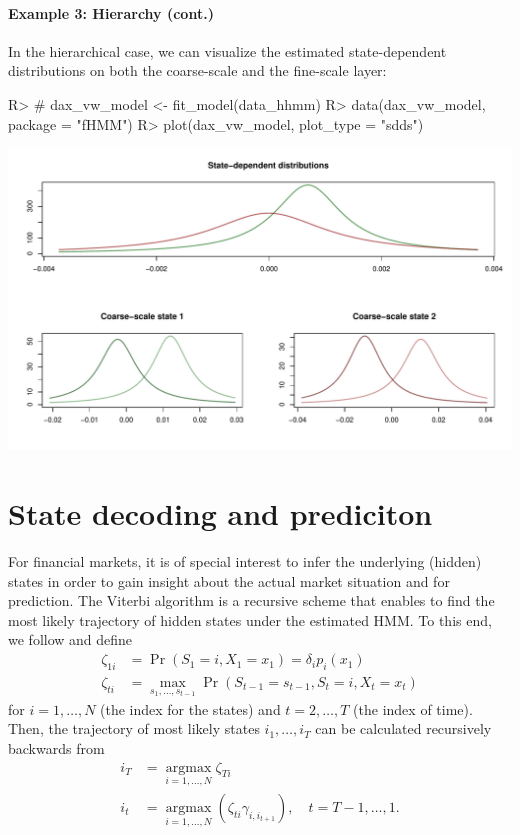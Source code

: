 \documentclass[article]{jss}
\begin{document}
\paragraph{Example 3: Hierarchy (cont.)}

In the hierarchical case, we can visualize the estimated state-dependent distributions on both the coarse-scale and the fine-scale layer:

%
\begin{Schunk}
\begin{Sinput}
R> # dax_vw_model <- fit_model(data_hhmm)
R> data(dax_vw_model, package = "fHMM")
R> plot(dax_vw_model, plot_type = "sdds")
\end{Sinput}
\end{Schunk}
\includegraphics{fhmm_oelschlaeger_adam_michels-hhmm-sdds}
%

\section{State decoding and prediciton} \label{sec:state_decoding_and_prediction} %

For financial markets, it is of special interest to infer the underlying (hidden) states in order to gain insight about the actual market situation and for prediction. The Viterbi algorithm \citep{for73} is a recursive scheme that enables to find the most likely trajectory of hidden states under the estimated HMM. To this end, we follow \cite{zuc16} and define
\begin{align*}
  \zeta_{1i} &= \Pr(S_1 = i, X_1 = x_1) = \delta_i p_i(x_1) \\
  \zeta_{ti} &= \operatorname*{max}_{s_1, \ldots, s_{t-1}} \Pr(S_{t-1} = s_{t-1}, S_t = i, X_t = x_t)
\end{align*}
for $i = 1, \ldots, N$ (the index for the states) and $t = 2, \ldots, T$ (the index of time). Then, the trajectory of most likely states $i_1, \ldots, i_T$ can be calculated recursively backwards from
\begin{align*}
  i_T &= \operatorname*{argmax}_{i = 1, \ldots, N} \zeta_{Ti} \\
  i_t &= \operatorname*{argmax}_{i = 1, \ldots, N} (\zeta_{ti} \gamma_{i, i_{t+1}}), \quad t = T-1, \ldots, 1.
\end{align*}
\end{document}
